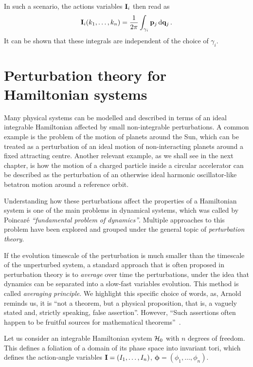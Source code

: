 In such a scenario, the actions variables $\vb{I}_i$ then read as
%
\begin{equation}
    \vb{I}_i(k_1,\dots,k_n) = \frac{1}{2\pi}\int_{\gamma_i} \vb{p}_j\, \dd \vb{q}_j\, .  
\end{equation} 
%
It can be shown that these integrals are independent of the choice of $\gamma_i$.~\cite{Arnold:937549}

\section{Perturbation theory for Hamiltonian systems}\label{sec:1:averaging}

Many physical systems can be modelled and described in terms of an ideal integrable Hamiltonian affected by small non-integrable perturbations. A common example is the problem of the motion of planets around the Sun, which can be treated as a perturbation of an ideal motion of non-interacting planets around a fixed attracting centre. Another relevant example, as we shall see in the next chapter, is how the motion of a charged particle inside a circular accelerator can be described as the perturbation of an otherwise ideal harmonic oscillator-like betatron motion around a reference orbit.

Understanding how these perturbations affect the properties of a Hamiltonian system is one of the main problems in dynamical systems, which was called by Poincaré \textit{``fundamental problem of dynamics''}. Multiple approaches to this problem have been explored and grouped under the general topic of \textit{perturbation theory}.

If the evolution timescale of the perturbation is much smaller than the timescale of the unperturbed system, a standard approach that is often proposed in perturbation theory is to \textit{average} over time the perturbations, under the idea that dynamics can be separated into a slow-fast variables evolution. This method is called \textit{averaging principle}. We highlight this specific choice of words, as, Arnold reminds us, it is ``not a theorem, but a physical proposition, that is, a vaguely stated and, strictly speaking, false assertion''. However, ``Such assertions often happen to be fruitful sources for mathematical theorems''~\cite{Arnold:937549}.

Let us consider an integrable Hamiltonian system $\mathcal{H}_0$ with $n$ degrees of freedom. This defines a foliation of a domain of its phase space into invariant tori, which defines the action-angle variables $\vb{I}=(I_1, \ldots, I_n)$, $\boldsymbol{\phi}=(\phi_1, \ldots, \phi_n)$. 

